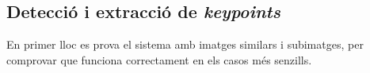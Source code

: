 


\newpage
	\subsection{Detecció i extracció de \textit{keypoints}}
		En primer lloc es prova el sistema amb imatges similars i subimatges, per comprovar  que funciona correctament en els casos més senzills.

